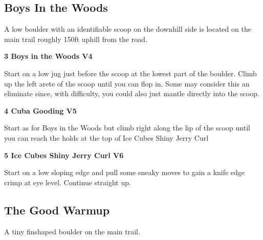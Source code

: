 \begin{multicols*}{2}
			\subsection*{Boys In the Woods}\label{bf:Boys In the Woods}
			\begin{minipage}{\columnwidth}
			A low boulder with an identifiable scoop on the downhill side is located on the main trail roughly 150ft uphill from the road.
			\end{minipage}
			

					\label{rt:Boys in the Woods}\colorbox{RoyalBlue!20}{\textbf{3 Boys in the Woods V4 \ding{72}   }}
					\begin{adjustwidth}{0.5cm}{}
					\begin{minipage}{\linewidth}					
					Start on a low jug just before the scoop at the lowest part of the boulder. Climb up the left arete of the scoop until you can flop in. Some may consider this an eliminate since, with difficulty, you could also just mantle directly into the scoop.
					\end{minipage}
					\end{adjustwidth}
					\label{rt:Cuba Gooding}\colorbox{RoyalBlue!20}{\textbf{4 Cuba Gooding V5  }}
					\begin{adjustwidth}{0.5cm}{}
					\begin{minipage}{\linewidth}					
					Start as for Boys in the Woods but climb right along the lip of the scoop until you can reach the holds at the top of Ice Cubes Shiny Jerry Curl
					\end{minipage}
					\end{adjustwidth}
					\label{rt:Ice Cubes Shiny Jerry Curl}\colorbox{RoyalBlue!20}{\textbf{5 Ice Cubes Shiny Jerry Curl V6  }}
					\begin{adjustwidth}{0.5cm}{}
					\begin{minipage}{\linewidth}					
					Start on a low sloping edge and pull some sneaky moves to gain a knife edge crimp at eye level. Continue straight up.
					\end{minipage}
					\end{adjustwidth}
			\subsection*{The Good Warmup}\label{bf:The Good Warmup}
			\begin{minipage}{\columnwidth}
			A tiny finshaped boulder on the main trail.
			\end{minipage}
			

\end{multicols*}
